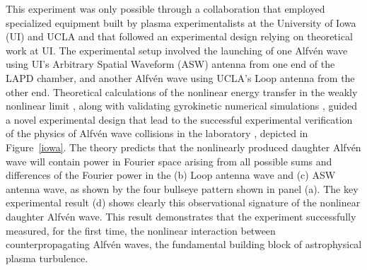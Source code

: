\documentclass[11pt]{article}
\newcommand\Alfven{Alfv\'en }
\renewcommand{\cite}{\citep}
\begin{document}
This experiment was only possible through a collaboration that
employed specialized equipment built by plasma experimentalists at the
University of Iowa (UI) and UCLA and that followed an experimental
design relying on theoretical work at UI.  The experimental setup
involved the launching of one \Alfven wave using UI's Arbitrary
Spatial Waveform (ASW) antenna \citep{Thuecks:2009,Kletzing:2010} from
one end of the LAPD chamber, and another \Alfven wave using UCLA's
Loop antenna \citep{auerbach:2011} from the other end. Theoretical
calculations of the nonlinear energy transfer in the weakly nonlinear
limit \cite{Howes:2013a}, along with validating gyrokinetic numerical
simulations \cite{Nielson:2013a}, guided a novel experimental design
\cite{Howes:2013b} that lead to the successful experimental
verification of the physics of \Alfven wave collisions in the
laboratory \cite{Howes:2012b,Drake:2013}, depicted in Figure~\ref{iowa}. The
theory predicts that the nonlinearly produced daughter \Alfven wave
will contain power in Fourier space arising from all possible sums and
differences of the Fourier power in the (b) Loop antenna wave and (c)
ASW antenna wave, as shown by the four bullseye pattern shown in panel
(a). The key experimental result (d) shows clearly this observational
signature of the nonlinear daughter \Alfven wave.  This result
demonstrates that the experiment successfully measured, for the first
time, the nonlinear interaction between counterpropagating \Alfven
waves, the fundamental building block of astrophysical plasma
turbulence.
\end{document}
